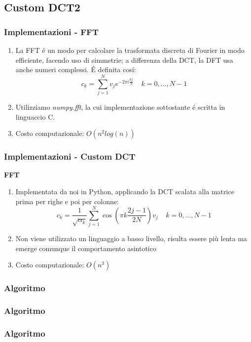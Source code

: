 \documentclass{beamer}
\begin{document}
\subsection{Custom DCT2}

\begin{frame}
\frametitle{Implementazioni - FFT}
\begin{enumerate}
\item La FFT \'e un modo per calcolare la trasformata discreta di Fourier in modo efficiente, facendo uso di simmetrie; a differenza della DCT, la DFT usa anche numeri complessi. \'E definita cos\'i:
\[c_k = \sum\limits_{j = 1}^N v_j e^{-2 \pi i \frac{kj}{N}} \;\;\;\; k = 0,...,N-1\]
\item Utilizziamo \textit{numpy.fft}, la cui implementazione sottostante \'e scritta in linguaccio C.
\item Costo computazionale: $O(n^2log(n))$
\end{enumerate}
\end{frame}
\begin{frame}
\frametitle{Implementazioni - Custom DCT}
\textbf{FFT}
\begin{enumerate}
\item Implementata da noi in Python, applicando la DCT scalata alla matrice prima per righe e poi per colonne:
\[c_k = \frac{1}{\sqrt{\alpha_k}} \sum\limits_{j=1}^N \cos(\pi k \frac{2j - 1}{2N}) v_j \;\;\;\; k = 0,...,N-1\]
\item Non viene utilizzato un linguaggio a basso livello, risulta essere più lenta ma emerge comunque il comportamento asintotico
\item Costo computazionale: $O(n^3)$
\end{enumerate}
\end{frame}

\begin{frame}
\frametitle{Algoritmo}
	
\end{frame}

\begin{frame}
\frametitle{Algoritmo}
	
\end{frame}

\begin{frame}
\frametitle{Algoritmo}
	
\end{frame}
\end{document}
